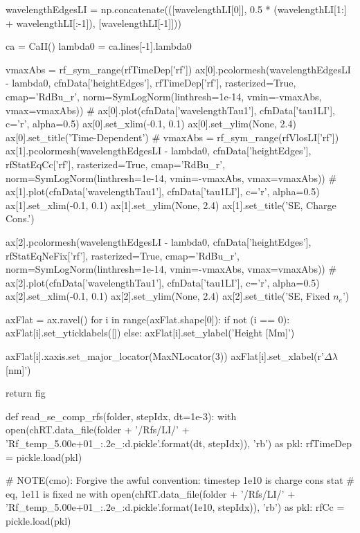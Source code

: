 \begin{pycode}[TimeDepRT]
    wavelengthEdgesLI = np.concatenate(([wavelengthLI[0]],
                                        0.5 * (wavelengthLI[1:] + wavelengthLI[:-1]),
                                        [wavelengthLI[-1]]))

    ca = CaII()
    lambda0 = ca.lines[-1].lambda0

    vmaxAbs = rf_sym_range(rfTimeDep['rf'])
    ax[0].pcolormesh(wavelengthEdgesLI - lambda0, cfnData['heightEdges'], rfTimeDep['rf'],
                        rasterized=True, cmap='RdBu_r',
                        norm=SymLogNorm(linthresh=1e-14, vmin=-vmaxAbs, vmax=vmaxAbs))
    # ax[0].plot(cfnData['wavelengthTau1'], cfnData['tau1LI'], c='r', alpha=0.5)
    ax[0].set_xlim(-0.1, 0.1)
    ax[0].set_ylim(None, 2.4)
    ax[0].set_title('Time-Dependent')
    # vmaxAbs = rf_sym_range(rfVlosLI['rf'])
    ax[1].pcolormesh(wavelengthEdgesLI - lambda0, cfnData['heightEdges'], rfStatEqCc['rf'],
                        rasterized=True, cmap='RdBu_r',
                        norm=SymLogNorm(linthresh=1e-14, vmin=-vmaxAbs, vmax=vmaxAbs))
    # ax[1].plot(cfnData['wavelengthTau1'], cfnData['tau1LI'], c='r', alpha=0.5)
    ax[1].set_xlim(-0.1, 0.1)
    ax[1].set_ylim(None, 2.4)
    ax[1].set_title('SE, Charge Cons.')

    ax[2].pcolormesh(wavelengthEdgesLI - lambda0, cfnData['heightEdges'], rfStatEqNeFix['rf'],
                        rasterized=True, cmap='RdBu_r',
                        norm=SymLogNorm(linthresh=1e-14, vmin=-vmaxAbs, vmax=vmaxAbs))
    # ax[2].plot(cfnData['wavelengthTau1'], cfnData['tau1LI'], c='r', alpha=0.5)
    ax[2].set_xlim(-0.1, 0.1)
    ax[2].set_ylim(None, 2.4)
    ax[2].set_title('SE, Fixed $n_e$')

    axFlat = ax.ravel()
    for i in range(axFlat.shape[0]):
        if not (i == 0):
            axFlat[i].set_yticklabels([])
        else:
            axFlat[i].set_ylabel('Height [Mm]')

        axFlat[i].xaxis.set_major_locator(MaxNLocator(3))
        axFlat[i].set_xlabel(r'$\Delta\lambda$ [nm]')

    return fig

def read_se_comp_rfs(folder, stepIdx, dt=1e-3):
    with open(chRT.data_file(folder + '/Rfs/LI/' + 'Rf_temp_5.00e+01_{:.2e}_{:d}.pickle'.format(dt, stepIdx)), 'rb') as pkl:
        rfTimeDep = pickle.load(pkl)

    # NOTE(cmo): Forgive the awful convention: timestep 1e10 is charge cons stat
    # eq, 1e11 is fixed ne
    with open(chRT.data_file(folder + '/Rfs/LI/' + 'Rf_temp_5.00e+01_{:.2e}_{:d}.pickle'.format(1e10, stepIdx)), 'rb') as pkl:
        rfCc = pickle.load(pkl)


\end{pycode}
